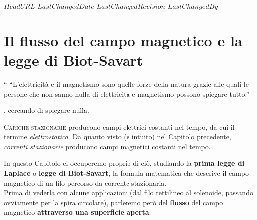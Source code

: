 \svnidlong
{$HeadURL$}
{$LastChangedDate$}
{$LastChangedRevision$}
{$LastChangedBy$}

\chapter{Il flusso del campo magnetico e la legge di Biot-Savart}

\begin{introduction}``
	``L’elettricità e il magnetismo sono quelle forze della natura grazie alle quali le persone che non sanno nulla di elettricità e magnetismo possono spiegare tutto.''
	\begin{flushright}
		, cercando di spiegare nulla.
	\end{flushright}
\end{introduction}
\lettrine[findent=1pt, nindent=0pt]{C}{ariche stazionarie} producono campi elettrici costanti nel tempo, da cui il termine \textit{elettrostatica}. Da quanto visto (e intuito) nel Capitolo precedente, \textit{correnti stazionarie} producono campi magnetici costanti nel tempo.

In questo Capitolo ci occuperemo proprio di ciò, studiando la \textbf{prima legge di Laplace} o \textbf{legge di Biot-Savart}, la formula matematica che descrive il campo magnetico di un filo percorso da corrente stazionaria.\\
Prima di vederla con alcune applicazioni (dal filo rettilineo al solenoide, passando ovviamente per la spira circolare), parleremo però del \textbf{flusso} del campo magnetico \textbf{attraverso una superficie aperta}.


